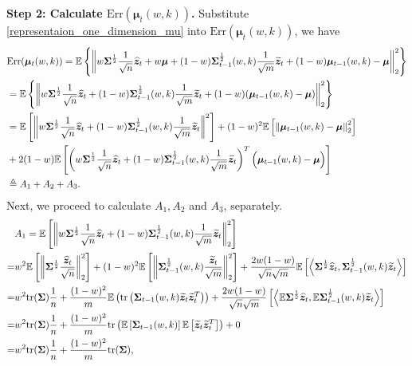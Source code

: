 \noindent
\textbf{Step 2: Calculate $\mathrm{Err}(\bm{\mu}_{t}(w,k) )$.} Substitute \eqref{representaion_one_dimension_mu} into $\mathrm{Err}(\bm{\mu}_{t}(w,k) )$, we have
\begin{align}
\label{Uni_Eq2}
&\text{Err}(\bm{\mu}_{t}(w,k)) 
= \mathbb{E}\left\{\left \|  
w\bm{\Sigma}^{\frac{1}{2}} \frac{1}{\sqrt{n}}\widehat{\bm{z}}_t + w\bm{\mu} + (1-w)\bm{\Sigma}^{\frac{1}{2}}_{t-1}(w,k)\frac{1}{\sqrt{m}}\widetilde{\bm{z}}_t + (1-w)\bm{\mu}_{t-1}(w,k) - \bm{\mu}\right \|_2^2\right\}\notag  \\
&= \mathbb{E}\left\{\left\|
w \bm{\Sigma}^{\frac{1}{2}} \frac{1}{\sqrt{n}}\widehat{\bm{z}}_t + (1-w)\bm{\Sigma}_{t-1}^{\frac{1}{2}}(w,k)\frac{1}{\sqrt{m}}\widetilde{\bm{z}}_t + (1-w)(\bm{\mu}_{t-1}(w,k)-\bm{\mu})\right\|_2^2\right\}\notag \\
& = \mathbb{E}\left[\left\| w \bm{\Sigma}^{\frac{1}{2}} \frac{1}{\sqrt{n}}\widehat{\bm{z}}_t + (1-w)\bm{\Sigma}_{t-1}^{\frac{1}{2}}(w,k)\frac{1}{\sqrt{m}}\widetilde{\bm{z}}_t\right\|^2\right]+
(1-w)^2\mathbb{E}\left[\left\|\bm{\mu}_{t-1}(w,k)-\bm{\mu}\right\|_2^2\right]\notag  \\
&+2(1-w)\mathbb{E}\left[\left(w \bm{\Sigma}^{\frac{1}{2}} \frac{1}{\sqrt{n}}\widehat{\bm{z}}_t + (1-w)\bm{\Sigma}_{t-1}^{\frac{1}{2}}(w,k)\frac{1}{\sqrt{m}}\widetilde{\bm{z}}_t\right)^T
\Big(\bm{\mu}_{t-1}(w,k)-\bm{\mu}\Big)\right]\notag 
\\
&\triangleq A_1 +A_2 +A_3.
\end{align}
Next, we proceed to calculate $A_1,A_2$ and $A_3$, separately.
\begin{align}
&A_1 = \mathbb{E}\left[\left\| w \bm{\Sigma}^{\frac{1}{2}} \frac{1}{\sqrt{n}}\widehat{\bm{z}}_t + (1-w)\bm{\Sigma}_{t-1}^{\frac{1}{2}}(w,k)\frac{1}{\sqrt{m}}\widetilde{\bm{z}}_t\right\|_2^2\right] \notag \\
=&w^2\mathbb{E}\left[\left\|  \bm{\Sigma}^{\frac{1}{2}} \frac{\widehat{\bm{z}}_t}{\sqrt{n}}\right\|_2^2   \right]
+{(1-w)^2}\mathbb{E}\left[\left\|
\bm{\Sigma}_{t-1}^{\frac{1}{2}}(w,k)\frac{\widetilde{\bm{z}}_t}{\sqrt{m}}
\right\|_2^2\right] 
+\frac{2w(1-w)}{\sqrt{n}\sqrt{m}} \mathbb{E}\left[  \left< \bm{\Sigma}^{\frac{1}{2}} \widehat{\bm{z}}_t, \bm{\Sigma}_{t-1}^{\frac{1}{2}}(w,k)\widetilde{\bm{z}}_t\right>  \right]
\notag \\
=&w^2\mathrm{tr}(\bm{\Sigma}) \frac{1}{n}+\frac{(1-w)^2}{m}\mathbb{E}\left(\mathrm{tr}\left( 
\bm{\Sigma}_{t-1}(w,k)\widetilde{\bm{z}}_t \widetilde{\bm{z}}_t^T
\right)
\right)+\frac{2w(1-w)}{\sqrt{n}\sqrt{m}}\left[  \left<\mathbb{E} \bm{\Sigma}^{\frac{1}{2}} \widehat{\bm{z}}_t, \mathbb{E}\bm{\Sigma}_{t-1}^{\frac{1}{2}}(w,k)\widetilde{\bm{z}}_t\right>  \right]
\notag 
\\=&w^2\mathrm{tr}(\bm{\Sigma}) \frac{1}{n}+\frac{(1-w)^2}{m}\mathrm{tr}\left(\mathbb{E}\left[ 
\bm{\Sigma}_{t-1}(w,k)\right]\mathbb{E}\left[\widetilde{\bm{z}}_t \widetilde{\bm{z}}_t^T\right]
\right)
+0 \notag
\\=&w^2 \mathrm{tr}(\bm{\Sigma}) \frac{1}{n} +\frac{(1-w)^2}{m} \mathrm{tr}(\bm{\Sigma}),
\end{align}
